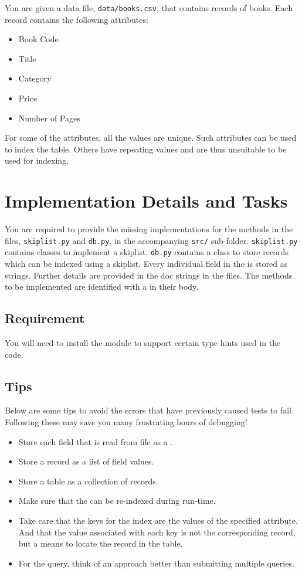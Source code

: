 \documentclass[addpoints]{exam}
\begin{document}
You are given a data file, \texttt{data/books.csv}, that contains records of books. Each record contains the following attributes:
\begin{itemize}
  \item Book Code
  \item Title
  \item Category
  \item Price
  \item Number of Pages
\end{itemize}
For some of the attributes, all the values are unique. Such attributes can be used to index the table. Others have repeating values and are thus unsuitable to be used for indexing.

\section{Implementation Details and Tasks}

You are required to provide the missing implementations for the methods in the files, \texttt{skiplist.py} and \texttt{db.py}, in the accompanying \texttt{src/} sub-folder. \texttt{skiplist.py} contains classes to implement a skiplist. \texttt{db.py} contains a  class to store records which can be indexed using a skiplist. Every individual field in the  is stored as strings. Further details are provided in the doc strings in the files. The methods to be implemented are identified with a  in their body.

\subsection{Requirement}

You will need to install the  module to support certain type hints used in the code.

\subsection{Tips}

Below are some tips to avoid the errors that have previously caused tests to fail. Following these may save you many frustrating hours of debugging!
\begin{itemize}
  \item Store each field that is read from file as a .
  \item Store a record as a list of field values.
  \item Store a table as a collection of records.
  \item Make sure that the  can be re-indexed during run-time.
  \item Take care that the keys for the index are the values of the specified attribute. And that the value associated with each key is not the corresponding record, but a means to locate the record in the table.
  \item For the  query, think of an approach better than submitting multiple  queries.
\end{itemize}
\end{document}
